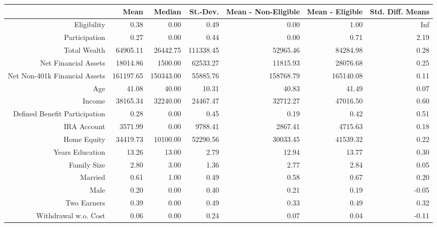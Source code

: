 \documentclass[10pt,a4paper]{article}
\begin{document}
\begin{table}[ht]
\centering
\begin{tabular}{rrrrrrr}
  \hline
 & Mean & Median & St.-Dev. & Mean - Non-Eligible & Mean - Eligible & Std. Diff. Means \\ 
  \hline
Eligibility & 0.38 & 0.00 & 0.49 & 0.00 & 1.00 & Inf \\ 
  Participation & 0.27 & 0.00 & 0.44 & 0.00 & 0.71 & 2.19 \\ 
  Total Wealth & 64905.11 & 26442.75 & 111338.45 & 52965.46 & 84284.98 & 0.28 \\ 
  Net Financial Assets & 18014.86 & 1500.00 & 62533.27 & 11815.93 & 28076.68 & 0.25 \\ 
  Net Non-401k Financial Assets & 161197.65 & 150343.00 & 55885.76 & 158768.79 & 165140.08 & 0.11 \\ 
  Age & 41.08 & 40.00 & 10.31 & 40.83 & 41.49 & 0.07 \\ 
  Income & 38165.34 & 32240.00 & 24467.47 & 32712.27 & 47016.50 & 0.60 \\ 
  Defined Benefit Participation & 0.28 & 0.00 & 0.45 & 0.19 & 0.42 & 0.51 \\ 
  IRA Account & 3571.99 & 0.00 & 9788.41 & 2867.41 & 4715.63 & 0.18 \\ 
  Home Equity & 34419.73 & 10100.00 & 52290.56 & 30033.45 & 41539.32 & 0.22 \\ 
  Years Education & 13.26 & 13.00 & 2.79 & 12.94 & 13.77 & 0.30 \\ 
  Family Size & 2.80 & 3.00 & 1.36 & 2.77 & 2.84 & 0.05 \\ 
  Married & 0.61 & 1.00 & 0.49 & 0.58 & 0.67 & 0.20 \\ 
  Male & 0.20 & 0.00 & 0.40 & 0.21 & 0.19 & -0.05 \\ 
  Two Earners & 0.39 & 0.00 & 0.49 & 0.33 & 0.49 & 0.32 \\ 
  Withdrawal w.o. Cost & 0.06 & 0.00 & 0.24 & 0.07 & 0.04 & -0.11 \\ 
   \hline
\end{tabular}
\end{table}
\end{document}
